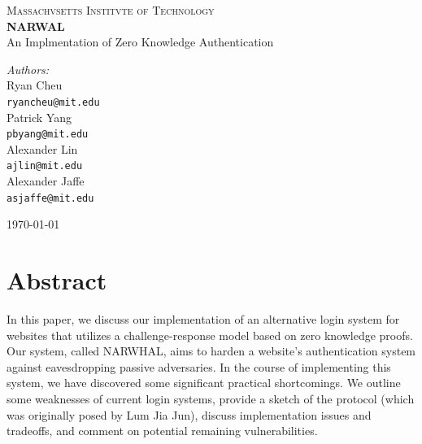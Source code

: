\documentclass[11pt]{article}
\begin{document}
\begin{titlepage}

\begin{center}

\textsc{\LARGE Massachvsetts Institvte of Technology}\\[0.5cm]


{ \huge \bfseries NARWAL \\[0.4cm] }
{\Large An Implmentation of Zero Knowledge Authentication}\\[0.5cm]


\begin{minipage}{0.4\textwidth}
\begin{flushleft} \large
\emph{Authors:}\\[0.5cm]
Ryan Cheu \\
{\tt ryancheu@mit.edu} \\[1cm]
Patrick Yang \\
{\tt pbyang@mit.edu} \\[1cm]
Alexander Lin \\
{\tt ajlin@mit.edu} \\[1cm]
Alexander Jaffe \\
{\tt asjaffe@mit.edu}
\end{flushleft}
\end{minipage}
\begin{minipage}{0.4\textwidth}
\begin{flushright} \large

\end{flushright}
\end{minipage}

\vfill

{\large \today}

\end{center}

\end{titlepage}

\section{Abstract}

In this paper, we discuss our implementation of an alternative login system for websites that utilizes a challenge-response model based on zero knowledge proofs.  Our system, called NARWHAL, aims to harden a website’s authentication system against eavesdropping passive adversaries.  In the course of implementing this system, we have discovered some significant practical shortcomings.  We outline some weaknesses of current login systems, provide a sketch of the protocol (which was originally posed by Lum Jia Jun), discuss implementation issues and tradeoffs, and comment on potential remaining vulnerabilities.
\end{document}
